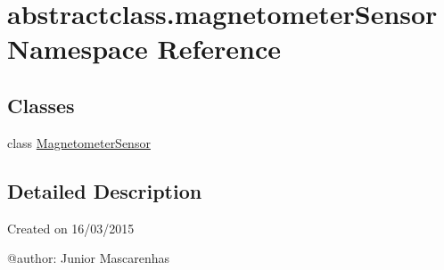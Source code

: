 \hypertarget{namespaceabstractclass_1_1magnetometerSensor}{}\section{abstractclass.\+magnetometer\+Sensor Namespace Reference}
\label{namespaceabstractclass_1_1magnetometerSensor}
\subsection*{Classes}
\begin{DoxyCompactItemize}
\item 
class \hyperlink{classabstractclass_1_1magnetometerSensor_1_1MagnetometerSensor}{Magnetometer\+Sensor}
\end{DoxyCompactItemize}


\subsection{Detailed Description}
\begin{DoxyVerb}Created on 16/03/2015

@author: Junior Mascarenhas
\end{DoxyVerb}
 